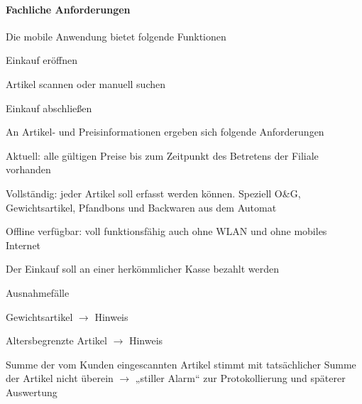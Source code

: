 \paragraph{Fachliche Anforderungen}
\begin{seList}
	\item Die mobile Anwendung bietet folgende Funktionen
	\begin{seList}
		\item Einkauf eröffnen
		\item Artikel scannen oder manuell suchen
		\item Einkauf abschließen
	\end{seList}
	\item An Artikel- und Preisinformationen ergeben sich folgende Anforderungen
	\begin{seList}
		\item Aktuell: alle gültigen Preise bis zum Zeitpunkt des Betretens der Filiale vorhanden
		\item Vollständig: jeder Artikel soll erfasst werden können. Speziell O\&G, Gewichtsartikel, Pfandbons und Backwaren aus dem Automat
		\item Offline verfügbar: voll funktionsfähig auch ohne WLAN und ohne mobiles Internet
	\end{seList}
	\item Der Einkauf soll an einer herkömmlicher Kasse bezahlt werden
	\item Ausnahmefälle
	\begin{seList}
		\item Gewichtsartikel $\rightarrow$ Hinweis
		\item Altersbegrenzte Artikel $\rightarrow$ Hinweis
		\item Summe der vom Kunden eingescannten Artikel stimmt mit tatsächlicher Summe der Artikel nicht überein $\rightarrow$ „stiller Alarm“ zur Protokollierung und späterer Auswertung
	\end{seList}
\end{seList}

